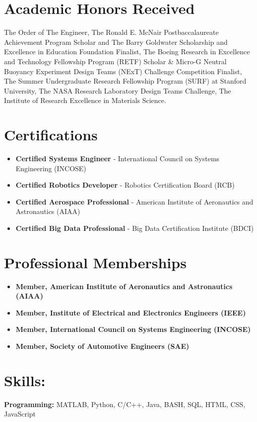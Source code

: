 \documentclass[letterpaper,10pt]{article}
\begin{document}
\section*{Academic Honors Received}
The Order of The Engineer, The Ronald E. McNair Postbaccalaureate Achievement Program Scholar and The Barry Goldwater Scholarship and Excellence in Education Foundation Finalist, The Boeing Research in Excellence and Technology Fellowship Program (RETF) Scholar & Micro-G Neutral Buoyancy Experiment Design Teams (NExT) Challenge Competition Finalist, The Summer Undergraduate Research Fellowship Program (SURF) at Stanford University, The NASA Research Laboratory Design Teams Challenge, The Institute of Research Excellence in Materials Science.

\section*{Certifications}
\begin{itemize}[left=0pt]
\item \textbf{Certified Systems Engineer} - International Council on Systems Engineering (INCOSE)
\item \textbf{Certified Robotics Developer} - Robotics Certification Board (RCB)
\item \textbf{Certified Aerospace Professional} - American Institute of Aeronautics and Astronautics (AIAA)
\item \textbf{Certified Big Data Professional} - Big Data Certification Institute (BDCI)
\end{itemize}

\section*{Professional Memberships}
\begin{itemize}[left=0pt]
\item \textbf{Member, American Institute of Aeronautics and Astronautics (AIAA)}
\item \textbf{Member, Institute of Electrical and Electronics Engineers (IEEE)}
\item \textbf{Member, International Council on Systems Engineering (INCOSE)}
\item \textbf{Member, Society of Automotive Engineers (SAE)}
\end{itemize}

\section*{Skills:}
\textbf{Programming:} MATLAB, Python, C/C++, Java, BASH, SQL, HTML, CSS, JavaScript
\end{document}
